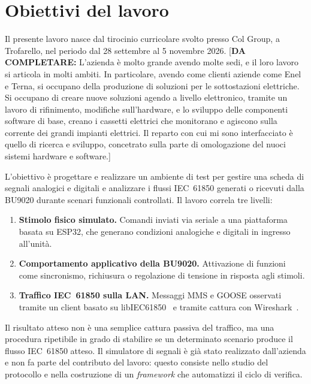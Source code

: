 \documentclass[11pt,a4paper,italian,oneside,openany]{book}
\newcommand{\daf}[1]{{\color{red}[\textbf{DA COMPLETARE:} #1]}}
\begin{document}
\section{Obiettivi del lavoro}
Il presente lavoro nasce dal tirocinio curricolare svolto presso Col Group, a Trofarello, nel periodo dal 28 settembre al 5 novembre 2026. \daf{L'azienda è molto grande avendo molte sedi, e il loro lavoro si articola in molti ambiti. In particolare, avendo come clienti aziende come Enel e Terna, si occupano della produzione di soluzioni per le sottostazioni elettriche. Si occupano di creare nuove soluzioni agendo a livello elettronico, tramite un lavoro di rifinimento, modifiche sull'hardware, e lo sviluppo delle componenti software di base, creano i cassetti elettrici che monitorano e agiscono sulla corrente dei grandi impianti elettrici. Il reparto con cui mi sono interfacciato è quello di ricerca e sviluppo, concetrato sulla parte di omologazione del nuoci sistemi hardware e software.}

L'obiettivo è progettare e realizzare un ambiente di test per gestire una scheda di segnali analogici e digitali e analizzare i flussi IEC~61850 generati o ricevuti dalla BU9020 durante scenari funzionali controllati. Il lavoro correla tre livelli:
\begin{enumerate}
    \item \textbf{Stimolo fisico simulato.} Comandi inviati via seriale a una piattaforma basata su ESP32, che generano condizioni analogiche e digitali in ingresso all'unità.
    \item \textbf{Comportamento applicativo della BU9020.} Attivazione di funzioni come sincronismo, richiusura o regolazione di tensione in risposta agli stimoli.
    \item \textbf{Traffico IEC~61850 sulla LAN.} Messaggi MMS e GOOSE osservati tramite un client basato su libIEC61850~\cite{libiec61850} e tramite cattura con Wireshark~\cite{wireshark}.
\end{enumerate}

Il risultato atteso non è una semplice cattura passiva del traffico, ma una procedura ripetibile in grado di stabilire se un determinato scenario produce il flusso IEC~61850 atteso. Il simulatore di segnali è già stato realizzato dall'azienda e non fa parte del contributo del lavoro: questo consiste nello studio del protocollo e nella costruzione di un \textit{framework} che automatizzi il ciclo di verifica.
\end{document}
